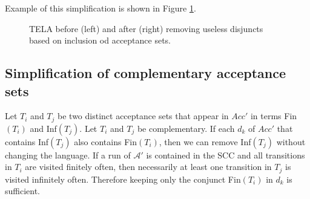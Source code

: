 \documentclass[
  digital, %
  twoside, %
  table,   %
  lof,     %
  lot,     %
]{fithesis3}
\begin{document}
Example of this simplification is shown in Figure \ref{fig:inclusion_remdis}.

\begin{figure}[h]
  \centering
  \caption{TELA before (left) and after (right) removing useless disjuncts based on inclusion od acceptance sets.}
  \label{fig:inclusion_remdis}
\end{figure}

\subsection{Simplification of complementary acceptance sets}
Let $T_i$ and $T_j$ be two distinct acceptance sets that appear in $Acc'$ in terms Fin$(T_i)$ and Inf$(T_j)$. Let $T_i$ and $T_j$ be complementary. If each $d_k$ of $Acc'$ that contains Inf$(T_j)$ also contains Fin$(T_i)$, then we can remove Inf$(T_j)$ without changing the language. If a run of $\mathcal{A'}$ is contained in the SCC and all transitions in $T_i$ are visited finitely often, then necessarily at least one transition in $T_j$ is visited infinitely often. Therefore keeping only the conjunct Fin$(T_i)$ in $d_k$ is sufficient. 
\end{document}
